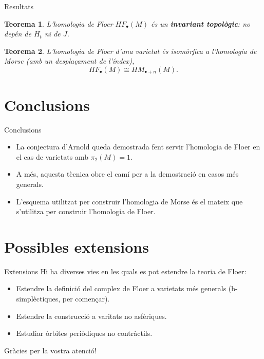 \documentclass{beamer}
\newtheorem{teorema}{Teorema}
\begin{document}
\begin{frame}{Resultats}
	\begin{teorema}
		L'homologia de Floer $HF_{\bullet}(M)$ és un {\bf invariant topològic}: no depén de $H_t$ ni de $J$.
	\end{teorema}

	\begin{teorema}
		L'homologia de Floer d'una varietat és isomòrfica a l'homologia de Morse (amb un desplaçament de l'índex),
		\[HF_{\bullet}(M) \cong HM_{\bullet+n}(M) .\]
	\end{teorema}
\end{frame}

\section{Conclusions}

\begin{frame}{Conclusions}
	\begin{itemize}
		\item La conjectura d'Arnold queda demostrada fent servir l'homologia de Floer en el cas de varietats amb $\pi_2(M) = 1$.
		\item A més, aquesta tècnica obre el camí per a la demostració en casos més generals.
		\item L'esquema utilitzat per construir l'homologia de Morse és el mateix que s'utilitza per construir l'homologia de Floer.
	\end{itemize}
\end{frame}

\section{Possibles extensions}

\begin{frame}{Extensions}
	Hi ha diverses vies en les quals es pot estendre la teoria de Floer:
	\begin{itemize}
		\item Estendre la definició del complex de Floer a varietats més generals (b-simplèctiques, per començar).
		\item Estendre la construcció a varitats no asfèriques.
		\item Estudiar òrbites periòdiques no contràctils.
	\end{itemize}
\end{frame}

\begin{frame}
	\begin{center}
		\huge Gràcies per la vostra atenció!
	\end{center}
\end{frame}
\end{document}
